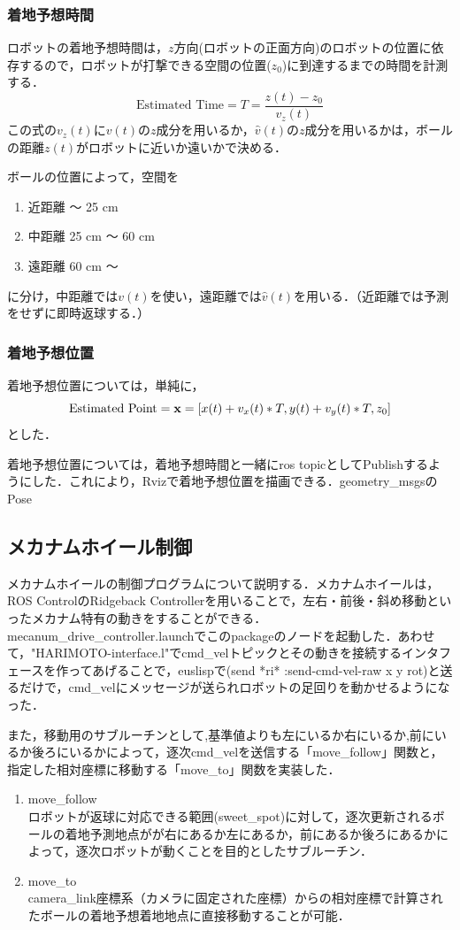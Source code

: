 \documentclass[10pt, oneside, titlepage]{ltjarticle}  %
\begin{document}
\subsubsection{着地予想時間}
ロボットの着地予想時間は，$z$方向(ロボットの正面方向)のロボットの位置に依存するので，ロボットが打撃できる空間の位置($z_0$)に到達するまでの時間を計測する．
\[\mbox{Estimated Time} = T = \frac{z(t)-z_0}{v_z(t)}\]
この式の$v_z(t)$に$v(t)$の$z$成分を用いるか，$\hat{v}(t)$の$z$成分を用いるかは，ボールの距離$z(t)$がロボットに近いか遠いかで決める．

ボールの位置によって，空間を
\begin{enumerate}
\item 近距離 〜 25 cm
\item 中距離 25 cm 〜 60 cm
\item 遠距離 60 cm 〜
\end{enumerate}
に分け，中距離では$v(t)$を使い，遠距離では$\hat{v}(t)$を用いる．（近距離では予測をせずに即時返球する．）

\subsubsection{着地予想位置}
着地予想位置については，単純に，
\[\mbox{Estimated Point} = {\bf x} = [x(t)+v_x(t)*T, y(t)+v_y(t)*T, z_0]\]
とした．　

着地予想位置については，着地予想時間と一緒にros topicとしてPublishするようにした．これにより，Rvizで着地予想位置を描画できる．geometry\_msgsのPose



\subsection{メカナムホイール制御}
メカナムホイールの制御プログラムについて説明する．メカナムホイールは，ROS ControlのRidgeback Controllerを用いることで，左右・前後・斜め移動といったメカナム特有の動きをすることができる\cite{mecanum}．mecanum\_drive\_controller.launchでこのpackageのノードを起動した．あわせて，"HARIMOTO-interface.l"でcmd\_velトピックとその動きを接続するインタフェースを作ってあげることで，euslispで(send *ri* :send-cmd-vel-raw x y rot)と送るだけで，cmd\_velにメッセージが送られロボットの足回りを動かせるようになった．

また，移動用のサブルーチンとして,基準値よりも左にいるか右にいるか,前にいるか後ろにいるかによって，逐次cmd\_velを送信する「move\_follow」関数と，指定した相対座標に移動する「move\_to」関数を実装した．
\begin{enumerate}
\item move\_follow \\
  ロボットが返球に対応できる範囲(sweet\_spot)に対して，逐次更新されるボールの着地予測地点がが右にあるか左にあるか，前にあるか後ろにあるかによって，逐次ロボットが動くことを目的としたサブルーチン．
  
\item move\_to \\
  camera\_link座標系（カメラに固定された座標）からの相対座標で計算されたボールの着地予想着地地点に直接移動することが可能．
\end{enumerate}
\end{document}
